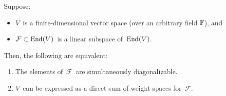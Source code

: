 
\vskip 0.5cm
\begin{proposition}
\label{SDiagonalizableEqualsDirectSumOfWeightSpaces}
\mbox{}
\vskip 0.1cm
\noindent
Suppose:
\begin{itemize}
\item
    $V$\, is a finite-dimensional vector space (over an arbitrary field $\mathbb{F}$), and
\item
    $\mathcal{F} \subset \textnormal{End}(V)$\, is a linear subspace of \,$\textnormal{End}(V)$.\,
\end{itemize}
Then, the following are equivalent:
\begin{enumerate}
\item
    The elements of \,$\mathcal{F}$\, are simultaneously diagonalizable.
\item
    $V$\, can be expressed as a direct sum of weight spaces for \,$\mathcal{F}$.
\end{enumerate}
\end{proposition}
\proof


